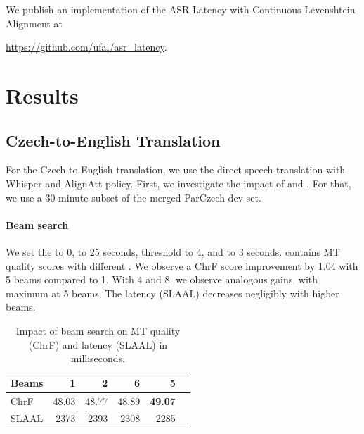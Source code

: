\documentclass[11pt]{article}
\begin{document}
We publish an implementation of the ASR Latency with Continuous
Levenshtein Alignment at

\centerline{\url{https://github.com/ufal/asr_latency}.}

\section{Results}

\subsection{Czech-to-English Translation}

For the Czech-to-English translation, we use the direct speech translation with Whisper and AlignAtt policy.
First, we investigate the impact of \Beams{} and \BufferLen{}. For that, we use a 30-minute subset of the merged ParCzech dev set. 

\paragraph{Beam search} We set the \MaxContextLen{} to 0, \BufferLen{} to 25 seconds, \Frames{} threshold to 4, and \MinChunkSize{} to 3 seconds.
 contains MT quality scores with different \Beams{}. We observe a ChrF score improvement by 1.04 with 5 beams compared to 1. With \Beams{} 4 and 8, we observe analogous gains, with maximum at 5 beams. The latency (SLAAL) decreases negligibly with higher beams. %

\begin{table}[]
    \centering
    \begin{tabular}{l|rrrrr}
Beams & 1 & 2 & 6 & 5 \\
\hline
ChrF & 48.03 & 48.77 & 48.89 & \textbf{49.07} \\
SLAAL & 2373 & 2393 & 2308 & 2285 \\
    \end{tabular}
    \caption{Impact of beam search on MT quality (ChrF) and latency (SLAAL) in milliseconds.}
    \label{tab:beam}
\end{table}
\end{document}

